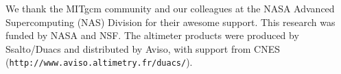 \documentclass[grl]{agutex2015}
\begin{document}
\begin{article}
%
%




%

\begin{acknowledgments}
We thank the MITgcm community and our colleagues at the NASA Advanced
Supercomputing (NAS) Division for their awesome support.
This research was funded by NASA and NSF.
The altimeter products were produced by Ssalto/Duacs
and distributed by Aviso, with support from CNES (\texttt{http://www.aviso.altimetry.fr/duacs/}).
\end{acknowledgments}


\end{article}
\end{document}
